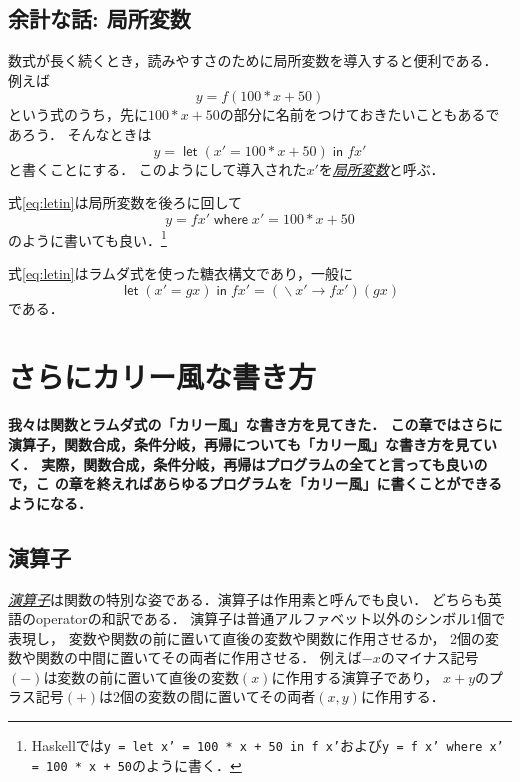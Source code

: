\documentclass[a5paper,draft]{jsbook}
\newcommand{\programminglanguage}[1]{\textsf{#1}}
\newcommand{\haskell}{\programminglanguage{Haskell}}
\newenvironment{leader}{\begingroup\bf}{\endgroup}
\newcommand{\keyword}[1]{{\underline{\emph{#1}}}}
\newcommand{\code}[1]{\texttt{#1}}
\newcommand{\mathUnaryOperator}[1]{\operatorname{#1}}
\newcommand{\mathLambda}{\mathUnaryOperator{\backslash}}
\newcommand{\mathLambdaArrow}{\rightarrow}
\newcommand{\mathKeyword}[1]{\operatorname{\textsf{#1}}}
\newcommand{\mathLetLet}{\mathKeyword{let}}
\newcommand{\mathLetIn}{\mathKeyword{in}}
\newcommand{\mathWhere}{\mathKeyword{where}}
\newcommand{\mathLambdaExpression}[2]{\mathLambda#1\mathLambdaArrow#2}
\newcommand{\mathLet}[2]{\mathLetLet#1\mathLetIn#2}
\begin{document}
\section{余計な話: 局所変数}

数式が長く続くとき，読みやすさのために局所変数を導入すると便利である．
例えば
\begin{equation}
y=f\left(100*x+50\right)
\end{equation}
という式のうち，先に$100*x+50$の部分に名前をつけておきたいこともあるであろう．
そんなときは
\begin{equation}
\label{eq:letin}
y=\mathLet{\left(x'=100*x+50\right)}{fx'}
\end{equation}
と書くことにする．
このようにして導入された$x'$を\keyword{局所変数}と呼ぶ．

式\eqref{eq:letin}は局所変数を後ろに回して
\begin{equation}
y=fx'\mathWhere x'=100*x+50
\end{equation}
のように書いても良い．\footnote{\haskell では\code{y = let x' = 100 * x + 50 in f x'}および\code{y = f x' where x' = 100 * x + 50}のように書く．}

式\eqref{eq:letin}はラムダ式を使った糖衣構文であり，一般に
\begin{equation}
\mathLet{\left(x'=gx\right)}{fx'}=(\mathLambdaExpression{x'}{fx'})(gx)
\end{equation}
である．

\chapter{さらにカリー風な書き方}

\begin{leader}
我々は関数とラムダ式の「カリー風」な書き方を見てきた．
この章ではさらに演算子，関数合成，条件分岐，再帰についても「カリー風」な書き方を見ていく．
実際，関数合成，条件分岐，再帰はプログラムの全てと言っても良いので，こ
の章を終えればあらゆるプログラムを「カリー風」に書くことができるようになる．
\end{leader}

\section{演算子}

\keyword{演算子}は関数の特別な姿である．演算子は作用素と呼んでも良い．
どちらも英語のoperatorの和訳である．
演算子は普通アルファベット以外のシンボル1個で表現し，
変数や関数の前に置いて直後の変数や関数に作用させるか，
2個の変数や関数の中間に置いてその両者に作用させる．
例えば$-x$のマイナス記号$(-)$は変数の前に置いて直後の変数$(x)$に作用する演算子であり，
$x+y$のプラス記号$(+)$は2個の変数の間に置いてその両者$\left(x,y\right)$に作用する．
\end{document}
